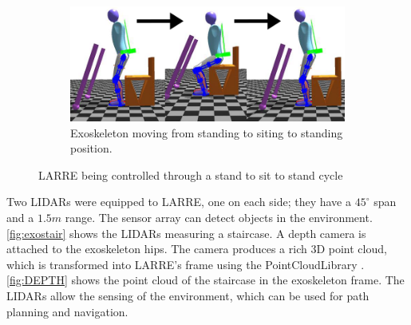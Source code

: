 \begin{figure}[h!]
\begin{subfigure}{0.5\textwidth}
        \label{fig:simsit2standtorque}
    \end{subfigure}\\[1ex]
    \begin{subfigure}{\linewidth}
        \centering
        \includegraphics[scale=.5]{images/sim/sit_to_stand2 (1).png}
        \caption[Exoskeleton Standing]{Exoskeleton moving from standing to siting to standing position.}
        \label{fig:sit2stand}
    \end{subfigure}
    \caption[LARRE Simulation standing to sit motion]{LARRE being controlled through a stand to sit to stand cycle}
    \label{fig:simwalking}
\end{figure}
 
 
 
 Two LIDARs were equipped to LARRE, one on each side; they have a $45^{\circ}$ span and a $1.5m$ range. The sensor array can detect objects in the environment. \autoref{fig:exostair} shows the LIDARs measuring a staircase. A depth camera is attached to the exoskeleton hips. The camera produces a rich 3D point cloud, which is transformed into LARRE's frame using the PointCloudLibrary \cite{Rusu_ICRA2011_PCL}.  \autoref{fig:DEPTH} shows the point cloud of the staircase in the exoskeleton frame. The LIDARs allow the sensing of the environment, which can be used for path planning and navigation. 


